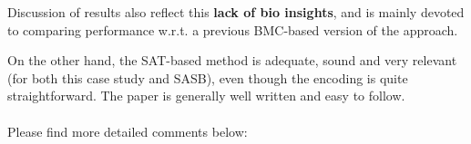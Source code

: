 \documentclass{llncs}
\begin{document}
{\color{red}{Fixed! refer new updated draft.\\}}

Discussion of results also reflect this \textbf{lack of bio insights}, and is mainly devoted to comparing performance w.r.t. a previous BMC-based version of the approach. \newline 
{\color{red}{Commented! see first review blue color paragraph\\}}

On the other hand, the SAT-based method is adequate, sound and very relevant (for
both this case study and SASB), even though the encoding is quite straightforward.
The paper is generally well written and easy to follow. \\ \\

Please find more detailed comments below:\\
\end{document}
